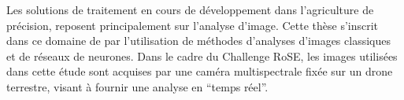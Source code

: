 \documentclass[../thesis.tex]{subfiles}
\begin{document}
    Les solutions de traitement en cours de développement dans l'agriculture de précision, reposent principalement sur l'analyse d'image. Cette thèse s'inscrit dans ce domaine de par l'utilisation de méthodes d'analyses d'images classiques et de réseaux de neurones. Dans le cadre du Challenge RoSE, les images utilisées dans cette étude sont acquises par une caméra multispectrale fixée sur un drone terrestre, visant à fournir une analyse en ``temps réel''. 
    
    
    
\end{document}
